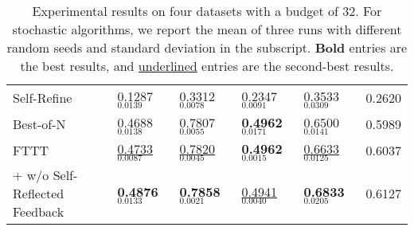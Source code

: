 \begin{table*}
{\begin{tabular}[t]{l|llll|c}
Self-Refine~\cite{DBLP:conf/nips/MadaanTGHGW0DPY23} & 0.1287$_{0.0139}$ & 0.3312$_{0.0078}$ & 0.2347$_{0.0091}$ & 0.3533$_{0.0309}$ & 0.2620 \\
Best-of-N~\cite{DBLP:journals/corr/abs-2407-21787} & 0.4688$_{0.0138}$ & 0.7807$_{0.0055}$ & \textbf{0.4962}$_{0.0171}$ & 0.6500$_{0.0141}$ & 0.5989 \\
\midrule
FTTT & \underline{0.4733}$_{0.0087}$ & \underline{0.7820}$_{0.0045}$ & \textbf{0.4962}$_{0.0015}$ & \underline{0.6633}$_{0.0125}$ & 0.6037 \\
+ w/o Self-Reflected Feedback & \textbf{0.4876}$_{0.0133}$ & \textbf{0.7858}$_{0.0021}$ & \underline{0.4941}$_{0.0040}$ & \textbf{0.6833}$_{0.0205}$ & 0.6127 \\
\bottomrule
\end{tabular}
}
\caption{Experimental results on four datasets with a budget of 32. For stochastic algorithms, we report the mean of three runs with different random seeds and standard deviation in the subscript. \textbf{Bold} entries are the best results, and \underline{underlined} entries are the second-best results.}
\label{tab:pilot}
\end{table*}